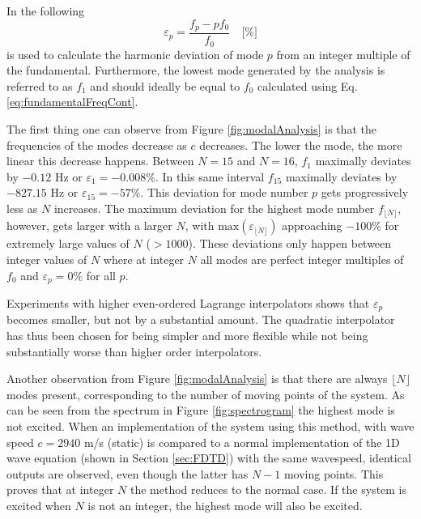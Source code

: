 In the following 
\begin{equation}
    \varepsilon_p = \frac{f_p - pf_0}{f_0}\quad \text{[\%]}
\end{equation}
is used to calculate the harmonic deviation of mode $p$ from an integer multiple of the fundamental. Furthermore, the lowest mode generated by the analysis is referred to as $f_1$ and should ideally be equal to $f_0$ calculated using Eq. \eqref{eq:fundamentalFreqCont}.

The first thing one can observe from Figure \ref{fig:modalAnalysis} is that the frequencies of the modes decrease as $c$ decreases. The lower the mode, the more linear this decrease happens. Between $N = 15$ and $N = 16$, $f_1$ maximally deviates by $-0.12$ Hz or $\varepsilon_1 = -0.008\%$. In this same interval $f_{15}$ maximally deviates by $-827.15$ Hz or $\varepsilon_{15} = -57\%$. This deviation for mode number $p$ gets progressively less as $N$ increases. The maximum deviation for the highest mode number $f_{\lfloor N\rfloor}$, however, gets larger with a larger $N$, with $\text{max}(\varepsilon_{\lfloor N \rfloor})$ approaching $-100\%$ for extremely large values of $N$ ($>1000$). These deviations only happen between integer values of $N$ where at integer $N$ all modes are perfect integer multiples of $f_0$ and $\varepsilon_p = 0 \%$ for all $p$.

Experiments with higher even-ordered Lagrange interpolators shows that $\varepsilon_p$ becomes smaller, but not by a substantial amount. The quadratic interpolator has thus been chosen for being simpler and more flexible while not being substantially worse than higher order interpolators.

Another observation from Figure \ref{fig:modalAnalysis} is that there are always $\lfloor N \rfloor$ modes present, corresponding to the number of moving points of the system. As can be seen from the spectrum in Figure \ref{fig:spectrogram} the highest mode is not excited. When an implementation of the system using this method, with wave speed $c = 2940$ m/s (static) is compared to a normal implementation of the 1D wave equation (shown in Section \ref{sec:FDTD}) with the same wavespeed, identical outputs are observed, even though the latter has $N-1$ moving points. This proves that at integer $N$ the method reduces to the normal case. If the system is excited when $N$ is not an integer, the highest mode will also be excited.

